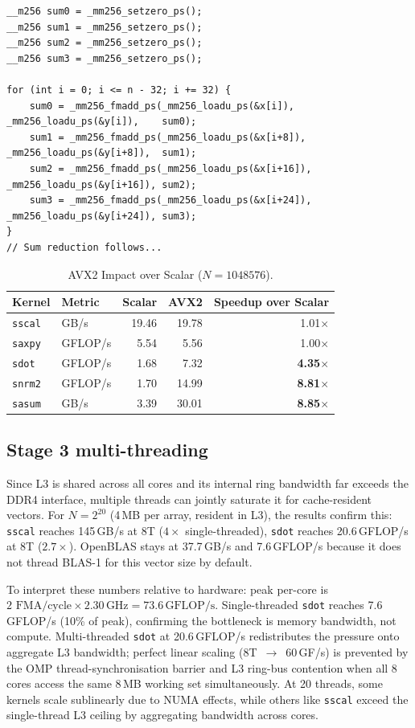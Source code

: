 \documentclass[11pt,a4paper]{article}
\begin{document}
\begin{lstlisting}[caption={AVX2 sdot inner loop with 4 independent accumulators to hide latency}]
__m256 sum0 = _mm256_setzero_ps();
__m256 sum1 = _mm256_setzero_ps();
__m256 sum2 = _mm256_setzero_ps();
__m256 sum3 = _mm256_setzero_ps();

for (int i = 0; i <= n - 32; i += 32) {
    sum0 = _mm256_fmadd_ps(_mm256_loadu_ps(&x[i]),    _mm256_loadu_ps(&y[i]),    sum0);
    sum1 = _mm256_fmadd_ps(_mm256_loadu_ps(&x[i+8]),  _mm256_loadu_ps(&y[i+8]),  sum1);
    sum2 = _mm256_fmadd_ps(_mm256_loadu_ps(&x[i+16]), _mm256_loadu_ps(&y[i+16]), sum2);
    sum3 = _mm256_fmadd_ps(_mm256_loadu_ps(&x[i+24]), _mm256_loadu_ps(&y[i+24]), sum3);
}
// Sum reduction follows...
\end{lstlisting}

\begin{table}[h]
\centering
\caption{AVX2 Impact over Scalar ($N = 1048576$).}
\small
\begin{tabular}{llrrr}
\toprule
Kernel & Metric & Scalar & AVX2 & Speedup over Scalar \\
\midrule
\texttt{sscal} & GB/s & 19.46 & 19.78 & 1.01$\times$ \\
\texttt{saxpy} & GFLOP/s & 5.54 & 5.56 & 1.00$\times$ \\
\texttt{sdot} & GFLOP/s & 1.68 & 7.32 & \textbf{4.35$\times$} \\
\texttt{snrm2} & GFLOP/s & 1.70 & 14.99 & \textbf{8.81$\times$} \\
\texttt{sasum} & GB/s & 3.39 & 30.01 & \textbf{8.85$\times$} \\
\bottomrule
\end{tabular}
\end{table}

\subsection*{Stage 3 multi-threading}
Since L3 is shared across all cores and its internal ring bandwidth far exceeds the DDR4 interface, multiple threads can jointly saturate it for cache-resident vectors. For $N=2^{20}$ (4\,MB per array, resident in L3), the results confirm this: \texttt{sscal} reaches 145\,GB/s at 8T ($4\times$ single-threaded), \texttt{sdot} reaches 20.6\,GFLOP/s at 8T ($2.7\times$). OpenBLAS stays at 37.7\,GB/s and 7.6\,GFLOP/s because it does not thread BLAS-1 for this vector size by default.

To interpret these numbers relative to hardware: peak per-core is $2 \text{ FMA/cycle} \times 2.30\,\text{GHz} = 73.6\,\text{GFLOP/s}$. Single-threaded \texttt{sdot} reaches 7.6\,GFLOP/s (10\% of peak), confirming the bottleneck is memory bandwidth, not compute. Multi-threaded \texttt{sdot} at 20.6\,GFLOP/s redistributes the pressure onto aggregate L3 bandwidth; perfect linear scaling (8T~$\to$~60\,GF/s) is prevented by the OMP thread-synchronisation barrier and L3 ring-bus contention when all 8 cores access the same 8\,MB working set simultaneously. At 20 threads, some kernels scale sublinearly due to NUMA effects, while others like \texttt{sscal} exceed the single-thread L3 ceiling by aggregating bandwidth across cores.
\end{document}
